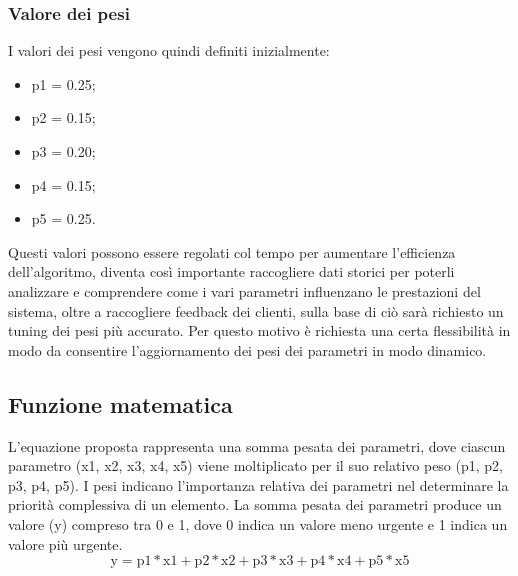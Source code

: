 \subsubsection*{Valore dei pesi}
I valori dei pesi vengono quindi definiti inizialmente:
\begin{itemize}
	\item p1 = 0.25;
	\item p2 = 0.15;
	\item p3 = 0.20;
	\item p4 = 0.15;
	\item p5 = 0.25.
\end{itemize}
Questi valori possono essere regolati col tempo per aumentare l’efficienza dell’algoritmo, diventa così importante raccogliere dati storici per poterli analizzare e comprendere come i vari parametri influenzano le prestazioni del sistema, oltre a raccogliere feedback dei clienti, sulla base di ciò sarà richiesto un tuning dei pesi più accurato. Per questo motivo è richiesta una certa flessibilità in modo da consentire l'aggiornamento dei pesi dei parametri in modo dinamico.

\subsection*{Funzione matematica}
L'equazione proposta rappresenta una somma pesata dei parametri, dove ciascun parametro (x1, x2, x3, x4, x5) viene moltiplicato per il suo relativo peso (p1, p2, p3, p4, p5). I pesi indicano l'importanza relativa dei parametri nel determinare la priorità complessiva di un elemento. La somma pesata dei parametri produce un valore (y) compreso tra 0 e 1, dove 0 indica un valore meno urgente e 1 indica un valore più urgente.
\begin{equation*}
	\text{y} = \text{p1}*{\text{x1}} + \text{p2}*{\text{x2}}  + \text{p3}*{\text{x3}}  + \text{p4}*{\text{x4}}  + \text{p5}*{\text{x5}} 
\end{equation*}

